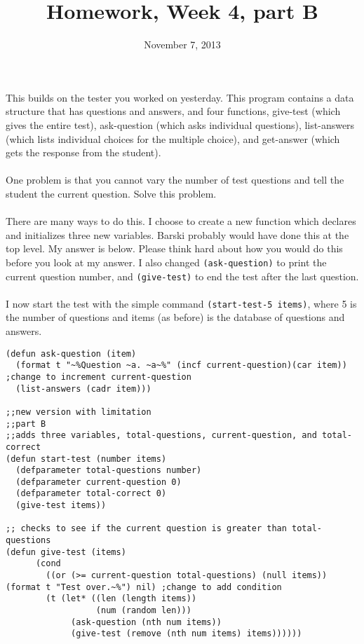 \documentclass{article}
\title{Homework, Week 4, part B}
\date{November 7, 2013}
\begin{document}
\maketitle{}

\paragraph{}This builds on the tester you worked on yesterday. This program contains a data structure that has questions and answers, and four functions, give-test (which gives the entire test), ask-question (which asks individual questions), list-answers (which lists individual choices for the multiple choice), and get-answer (which gets the response from the student).

\paragraph{}One problem is that you cannot vary the number of test questions and tell the student the current question. Solve this problem.

\paragraph{}There are many ways to do this. I choose to create a new function which declares and initializes three new variables. Barski probably would have done this at the top level. My answer is below. Please think hard about how you would do this before you look at my answer. I also changed \texttt{(ask-question)} to print the current question number, and \texttt{(give-test)} to end the test after the last question.

\paragraph{}I now start the test with the simple command \texttt{(start-test-5 items)}, where 5 is the number of questions and items (as before) is the database of questions and answers.

\lstset{language=Lisp,numbers=left,keepspaces=false,basicstyle=\small,numberstyle=\tiny,breaklines=true,showstringspaces=false}
\begin{lstlisting}
(defun ask-question (item)
  (format t "~%Question ~a. ~a~%" (incf current-question)(car item)) ;change to increment current-question
  (list-answers (cadr item)))

;;new version with limitation
;;part B
;;adds three variables, total-questions, current-question, and total-correct
(defun start-test (number items)
  (defparameter total-questions number)
  (defparameter current-question 0)
  (defparameter total-correct 0)
  (give-test items))

;; checks to see if the current question is greater than total-questions
(defun give-test (items)
      (cond
        ((or (>= current-question total-questions) (null items)) (format t "Test over.~%") nil) ;change to add condition
        (t (let* ((len (length items))
                  (num (random len)))
             (ask-question (nth num items))
             (give-test (remove (nth num items) items))))))
\end{lstlisting}
\end{document}
